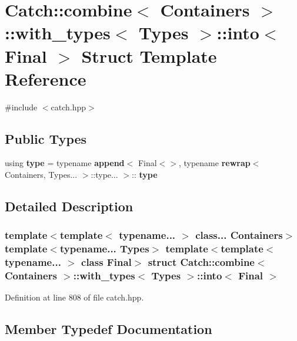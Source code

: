 \section{Catch\+::combine$<$ Containers $>$\+::with\+\_\+types$<$ Types $>$\+::into$<$ Final $>$ Struct Template Reference}
\label{struct_catch_1_1combine_1_1with__types_1_1into}


{\ttfamily \#include $<$catch.\+hpp$>$}

\subsection*{Public Types}
\begin{DoxyCompactItemize}
\item 
using \textbf{ type} = typename \textbf{ append}$<$ Final$<$$>$, typename \textbf{ rewrap}$<$ Containers, Types... $>$\+::type... $>$\+::\textbf{ type}
\end{DoxyCompactItemize}


\subsection{Detailed Description}
\subsubsection*{template$<$template$<$ typename... $>$ class... Containers$>$\newline
template$<$typename... Types$>$\newline
template$<$template$<$ typename... $>$ class Final$>$\newline
struct Catch\+::combine$<$ Containers $>$\+::with\+\_\+types$<$ Types $>$\+::into$<$ Final $>$}



Definition at line 808 of file catch.\+hpp.



\subsection{Member Typedef Documentation}
\mbox{\label{struct_catch_1_1combine_1_1with__types_1_1into_a62e7f47f468f2aedf969fb201b68bb81}} 
